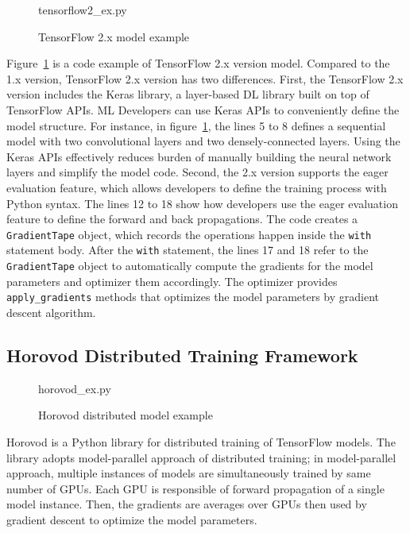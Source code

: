 \begin{figure}[ht!]

{tensorflow2_ex.py}
  \caption{TensorFlow 2.x model example}
\label{fig:back:tf2}
\end{figure}

Figure~\ref{fig:back:tf2} is a code example of TensorFlow 2.x version model.
Compared to the 1.x version, TensorFlow 2.x version has two differences.
First, the TensorFlow 2.x version includes the Keras library, a layer-based
DL library built on top of TensorFlow APIs.
ML Developers can use Keras APIs to conveniently define the model structure.
For instance, in figure~\ref{fig:back:tf2},
the lines 5 to 8 defines a sequential model with two convolutional layers and
two densely-connected layers.
Using the Keras APIs effectively reduces burden of manually building the neural
network layers and simplify the model code.
Second, the 2.x version supports the eager evaluation feature, which allows
developers to define the training process with Python syntax.
The lines 12 to 18 show how developers use the eager evaluation feature
to define the forward and back propagations. 
The code creates a {\tt GradientTape} object, which records the operations
happen inside the {\tt with} statement body.
After the {\tt with} statement, the lines 17 and 18 refer to the 
{\tt GradientTape} object to automatically compute the gradients 
for the model parameters and optimizer them accordingly.
The optimizer provides {\tt apply\_gradients} methods that optimizes 
the model parameters by gradient descent algorithm. 

\subsection{Horovod Distributed Training Framework}

\begin{figure}
 
{horovod_ex.py}
  \caption{Horovod distributed model example}
\label{fig:back:hvd} 
\end{figure}

Horovod is a Python library for distributed training of TensorFlow models.
The library adopts model-parallel approach of distributed training;
in model-parallel approach, multiple instances of models are simultaneously
trained by same number of GPUs.
Each GPU is responsible of forward propagation of a single model instance.
Then, the gradients are averages over GPUs then used by gradient descent
to optimize the model parameters. 

